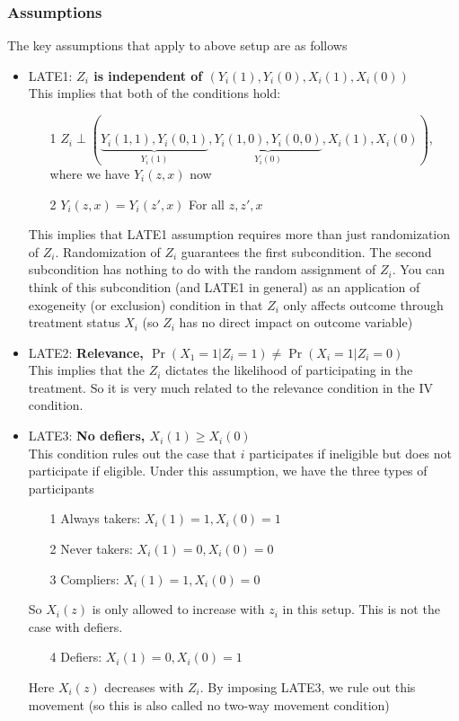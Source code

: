 \documentclass[12pt]{article}
\theoremstyle{definition}
\theoremstyle{property}
\theoremstyle{assumption}
\theoremstyle{example}
\theoremstyle{comment}
\begin{document}
\subsubsection{Assumptions}
The key assumptions that apply to above setup are as follows
\begin{itemize}
\item LATE1: \textbf{$Z_i$ is independent of $(Y_i(1), Y_i(0), X_i(1),X_i(0))$} \\
This implies that both of the conditions hold:
\begin{itemize}
\item[1] $Z_i\perp(\underbrace{Y_i(1,1),  Y_i(0,1)}_{Y_i(1)},\underbrace{Y_i(1,0), Y_i(0,0)}_{Y_i(0)}, X_i(1),X_i(0))$, where we have $Y_i(z,x)$ now
\item[2] $Y_i(z,x)=Y_i(z',x)$ For all $z,z',x$
\end{itemize}
This implies that LATE1 assumption requires more than just randomization of $Z_i$. Randomization of $Z_i$ guarantees the first subcondition. The second subcondition has nothing to do with the random assignment of $Z_i$. You can think of this subcondition (and LATE1 in general) as an application of exogeneity (or exclusion) condition in that $Z_i$ only affects outcome through treatment status $X_i$ (so $Z_i$ has no direct impact on outcome variable)
\item LATE2: \textbf{Relevance, $\Pr(X_1=1|Z_i=1) \neq \Pr(X_i=1|Z_i=0)$}\\
This implies that the $Z_i$ dictates the likelihood of participating in the treatment. So it is very much related to the relevance condition in the IV condition.

\item LATE3: \textbf{No defiers, $X_i(1)\geq X_i(0)$} \\
This condition rules out the case that $i$ participates if ineligible but does not participate if eligible. Under this assumption, we have the three types of participants
\begin{itemize}
\item[1] Always takers: $X_i(1)=1, X_i(0)=1$
\item[2] Never takers: $X_i(1)=0, X_i(0)=0$
\item[3] Compliers: $X_i(1)=1, X_i(0)=0$
\end{itemize}
So $X_i(z)$ is only allowed to increase with $z_i$ in this setup. This is not the case with defiers. 
\begin{itemize}
\item[4] Defiers: $X_i(1)=0, X_i(0)=1$
\end{itemize}
Here $X_i(z)$ decreases with $Z_i$. By imposing LATE3, we rule out this movement (so this is also called no two-way movement condition)
\end{itemize}
\end{document}
